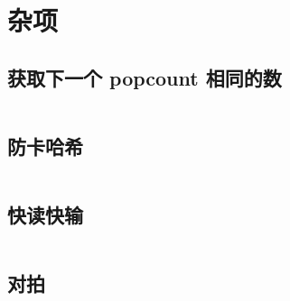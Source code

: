 \section{杂项}

\subsection{获取下一个 popcount 相同的数}

\inputminted{cpp}{icpc/misc/next_hamming/next_hamming.cpp}

\subsection{防卡哈希}

\inputminted{cpp}{icpc/misc/hash/hash.cpp}

\subsection{快读快输}

\inputminted{cpp}{icpc/misc/fastio/fastio.cpp}

\subsection{对拍}

\inputminted{cpp}{icpc/misc/hack/hack.cpp}